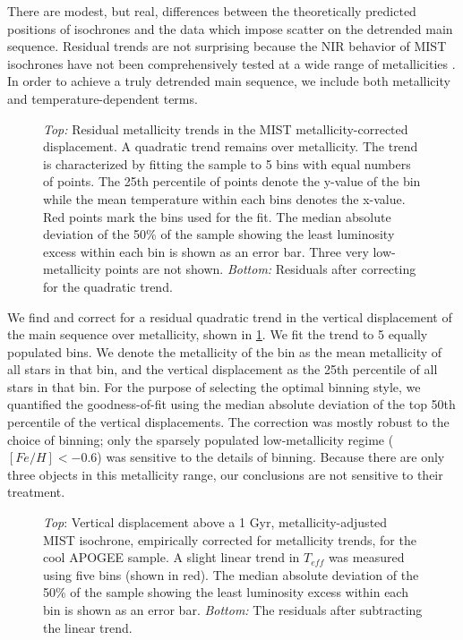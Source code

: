 \documentclass[manuscript]{aastex6}
\newcommand{\Teff}{\ensuremath{T_{eff}}}
\begin{document}
There are modest, but real, differences between the theoretically predicted
positions of isochrones and the data which impose scatter on the detrended main 
sequence. Residual trends are not surprising because the NIR behavior of MIST 
isochrones have not been comprehensively tested at a wide range of metallicities 
\citep{Choi16}.  In order to achieve a truly detrended main sequence, we include 
both metallicity and temperature-dependent terms.

\begin{figure}[htb]
    \centering
    \caption{\emph{Top:} Residual metallicity trends in the MIST 
        metallicity-corrected displacement. A quadratic trend remains over 
        metallicity. The trend is characterized by fitting the sample to 
        5 bins with equal numbers of points.  The 25th percentile of points 
        denote the y-value of the bin while the mean temperature within each
        bins denotes the x-value. Red points mark the bins used for the fit.
        The median absolute deviation of the 50\% of the sample showing the
        least luminosity excess within each bin is shown as an error bar. Three 
        very low-metallicity points are not shown.  \emph{Bottom:} Residuals 
        after correcting for the quadratic trend.}\label{fig:met_trend}
\end{figure}

We find and correct for a residual quadratic trend in the vertical 
displacement of the main sequence over metallicity, shown in 
\cref{fig:met_trend}.  We fit the trend to 5 equally populated bins. We denote 
the metallicity of the bin as the mean metallicity of all stars in that bin, 
and the vertical displacement as the 25th percentile of all stars in that bin. 
For the purpose of selecting the optimal binning style, we quantified the 
goodness-of-fit using the median absolute deviation of the top 50th percentile 
of the vertical displacements. The correction was mostly robust to the choice 
of binning; only the sparsely populated low-metallicity regime 
(\([Fe/H] < -0.6\)) was sensitive to the details of binning. Because there are 
only three objects in this metallicity range, our conclusions are not 
sensitive to their treatment.

\begin{figure}[htb]
    \centering
    \caption{\emph{Top}: Vertical displacement above a 1 Gyr,
        metallicity-adjusted MIST isochrone, empirically corrected for
        metallicity trends, for the cool APOGEE sample. A 
        slight linear trend in \Teff{} was measured using five bins (shown in
        red). The median absolute deviation of the 50\% of the sample showing 
        the least luminosity excess within each bin is shown as an error bar. 
        \emph{Bottom:} The residuals after subtracting the linear 
    trend.}\label{fig:apogee_teff_trend}
\end{figure}
\end{document}
